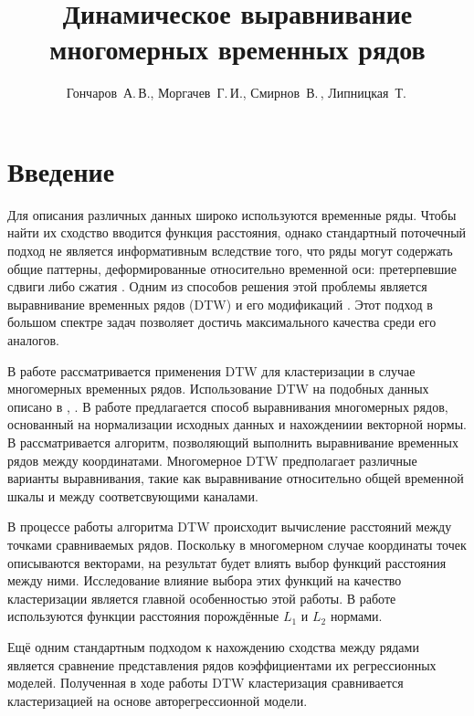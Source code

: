 \documentclass[12pt,twoside]{article}
\title
        {Динамическое выравнивание многомерных временных рядов}
\author
        {Гончаров~А.\,В., Моргачев~Г.\,И., Смирнов~В.\,, Липницкая~Т.\,} %
\begin{document}
    \maketitle
    \section{Введение}
        
        Для описания различных данных широко используются временные ряды.
        Чтобы найти их сходство вводится функция расстояния, однако стандартный поточечный подход не является информативным вследствие того,
        что ряды могут содержать общие паттерны, деформированные относительно временной оси: претерпевшие сдвиги либо сжатия \cite{01f4ab11a9ff49ff909094a135dcfe33}.
        Одним из способов решения этой проблемы является выравнивание временных рядов (DTW)  \cite{Keogh01derivativedynamic} и его модификаций \cite{journals/ida/SalvadorC07}.
        Этот подход в большом спектре задач позволяет достичь максимального качества среди его аналогов.
        
        В работе рассматривается применения DTW для кластеризации в случае многомерных временных рядов.
        Использование DTW на подобных данных описано в \cite{Holt2007}, \cite{Sanguansat2012MultipleMS}.
        В работе \cite{Holt2007} предлагается способ выравнивания многомерных рядов, основанный на нормализации исходных данных и нахождениии векторной нормы.
        В \cite{Sanguansat2012MultipleMS} рассматривается алгоритм, позволяющий выполнить выравнивание временных рядов между координатами. 
        Многомерное DTW предполагает различные варианты выравнивания, такие как выравнивание относительно общей временной шкалы и между соответсвующими каналами.
        
        В процессе работы алгоритма DTW происходит вычисление расстояний между точками сравниваемых рядов.
        Поскольку в многомерном случае координаты точек описываются векторами, на результат будет влиять выбор функций расстояния между ними.
        Исследование влияние выбора этих функций на качество кластеризации является главной особенностью этой работы.
        В работе используются функции расстояния порождённые $L_1$ и $L_2$ нормами.
        
        Ещё одним стандартным подходом к нахождению сходства между рядами является сравнение представления рядов коэффициентами их регрессионных моделей.
        Полученная в ходе работы DTW кластеризация сравнивается кластеризацией на основе авторегрессионной модели.
    
\end{document}
